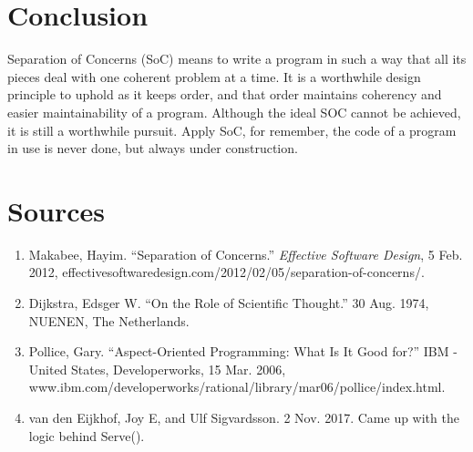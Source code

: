 \documentclass[11pt,a4paper]{article}
\begin{document}
\begin{flushleft}
\section{Conclusion}
Separation of Concerns (SoC) means to write a program in such a way that all its pieces deal with one coherent problem at a time. It is a worthwhile design principle to uphold as it keeps order, and that order maintains coherency and easier maintainability of a program. Although the ideal SOC cannot be achieved, it is still a worthwhile pursuit. Apply SoC, for remember, the code of a program in use is never done, but always under construction. 

\section{Sources}
\begin{enumerate}
\item Makabee, Hayim. “Separation of Concerns.” \textit{Effective Software Design}, 5 Feb. 2012, effectivesoftwaredesign.com/2012/02/05/separation-of-concerns/.
\item  Dijkstra, Edsger W. “On the Role of Scientific Thought.” 30 Aug. 1974, NUENEN, The Netherlands.
\item Pollice, Gary. “Aspect-Oriented Programming: What Is It Good for?” IBM - United States, Developerworks, 15 Mar. 2006, www.ibm.com/developerworks/rational/library/mar06/pollice/index.html.
\item van den Eijkhof, Joy E, and Ulf Sigvardsson. 2 Nov. 2017. Came up with the logic behind Serve().
\end{enumerate}

\end{flushleft}
\end{document}
